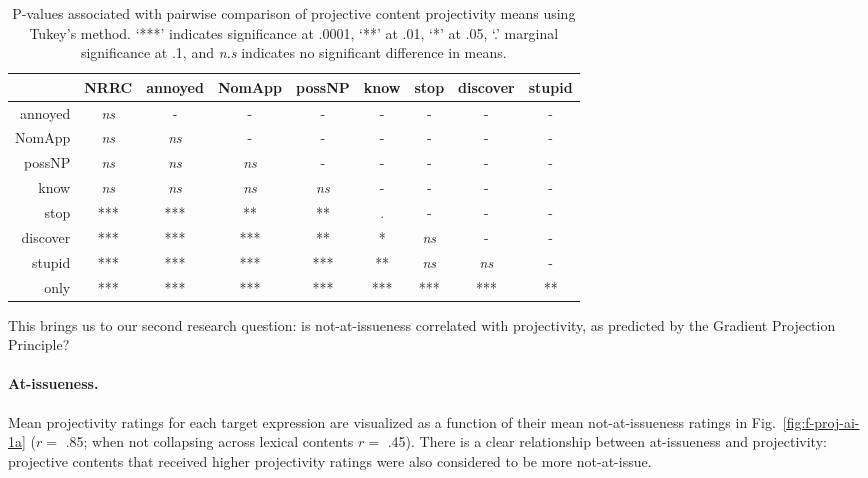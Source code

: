 \documentclass[11pt,fleqn]{article}
\newcommand{\6}{\mbox{$[\hspace*{-.6mm}[$}}
\newcommand{\9}{\mbox{$]\hspace*{-.6mm}]$}}
\newcommand{\figref}[1]{Fig.~\ref{#1}}
\begin{document}
\begin{table}[!h]
\begin{center}
\begin{tabular}{r c c c c c c c c}
\toprule
 &   NRRC & annoyed & NomApp &  possNP &  know & stop & discover & stupid \\
 \midrule
annoyed &  \emph{ns}  &  -  &        -   &       -  &        -  &   - &     -   &  -\\     
NomApp  &  \emph{ns} & \emph{ns} & -    &   -   &    -    &   -  &     -   & - \\    
possNP  &    \emph{ns} & \emph{ns} & \emph{ns} & - &      -  &     -     &  -   & - \\    
know     &   \emph{ns} & \emph{ns} & \emph{ns} & \emph{ns} & -   &    -   &    -       & -\\
stop     &   *** & *** & ** & ** & . & - &  - & -\\      
discover  &   *** & *** & *** & ** & * & \emph{ns} & - & -      \\
stupid    &  *** & *** & *** & *** & ** & \emph{ns} & \emph{ns} & - \\
only      &  *** & *** & *** & *** & *** & *** & *** & ** \\
\bottomrule
\end{tabular}
\caption{P-values associated with pairwise comparison of projective content projectivity means using Tukey's method. `***' indicates significance at .0001, `**' at .01, `*' at .05, `.' marginal significance at .1, and \emph{n.s} indicates no significant difference in means.}\label{tab:pairwise}
\end{center}
\end{table}

This brings us to our second research question: is not-at-issueness correlated with projectivity, as predicted by the Gradient Projection Principle?

\paragraph{At-issueness.} Mean projectivity ratings for each target expression are visualized as a function of their mean not-at-issueness ratings in \figref{fig:f-proj-ai-1a} ($r =$ .85; when not collapsing across lexical contents $r =$ .45). There is a clear relationship between at-issueness and projectivity: projective contents that received higher projectivity ratings were also considered to be more not-at-issue.
\end{document}
